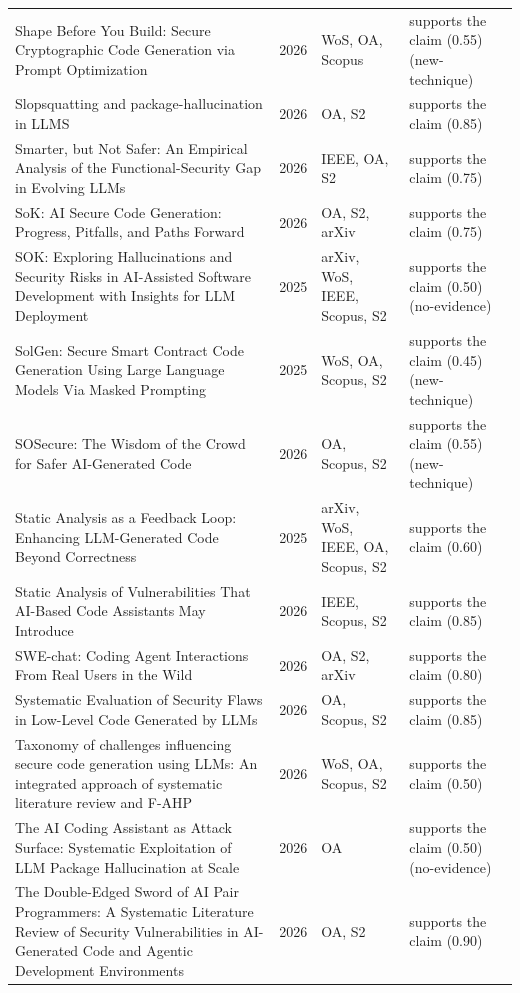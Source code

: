 \begin{longtable}{@{}%
  >{\raggedright\arraybackslash}p{}c%
  >{\raggedright\arraybackslash}p{}%
  >{\raggedright\arraybackslash}p{}@{}}
Shape Before You Build: Secure Cryptographic Code Generation via Prompt Optimization & 2026 & WoS, OA, Scopus & supports the claim (0.55) (new-technique) \\
Slopsquatting and package-hallucination in LLMS & 2026 & OA, S2 & supports the claim (0.85) \\
Smarter, but Not Safer: An Empirical Analysis of the Functional-Security Gap in Evolving LLMs & 2026 & IEEE, OA, S2 & supports the claim (0.75) \\
SoK: AI Secure Code Generation: Progress, Pitfalls, and Paths Forward & 2026 & OA, S2, arXiv & supports the claim (0.75) \\
SOK: Exploring Hallucinations and Security Risks in AI-Assisted Software Development with Insights for LLM Deployment & 2025 & arXiv, WoS, IEEE, Scopus, S2 & supports the claim (0.50) (no-evidence) \\
SolGen: Secure Smart Contract Code Generation Using Large Language Models Via Masked Prompting & 2025 & WoS, OA, Scopus, S2 & supports the claim (0.45) (new-technique) \\
SOSecure: The Wisdom of the Crowd for Safer AI-Generated Code & 2026 & OA, Scopus, S2 & supports the claim (0.55) (new-technique) \\
Static Analysis as a Feedback Loop: Enhancing LLM-Generated Code Beyond Correctness & 2025 & arXiv, WoS, IEEE, OA, Scopus, S2 & supports the claim (0.60) \\
Static Analysis of Vulnerabilities That AI-Based Code Assistants May Introduce & 2026 & IEEE, Scopus, S2 & supports the claim (0.85) \\
SWE-chat: Coding Agent Interactions From Real Users in the Wild & 2026 & OA, S2, arXiv & supports the claim (0.80) \\
Systematic Evaluation of Security Flaws in Low-Level Code Generated by LLMs & 2026 & OA, Scopus, S2 & supports the claim (0.85) \\
Taxonomy of challenges influencing secure code generation using LLMs: An integrated approach of systematic literature review and F-AHP & 2026 & WoS, OA, Scopus, S2 & supports the claim (0.50) \\
The AI Coding Assistant as Attack Surface: Systematic Exploitation of LLM Package Hallucination at Scale & 2026 & OA & supports the claim (0.50) (no-evidence) \\
The Double-Edged Sword of AI Pair Programmers: A Systematic Literature Review of Security Vulnerabilities in AI-Generated Code and Agentic Development Environments & 2026 & OA, S2 & supports the claim (0.90) \\

\end{longtable}
